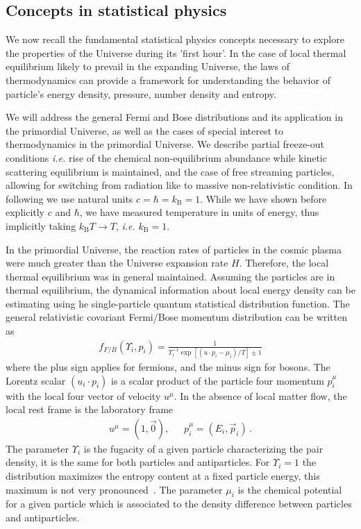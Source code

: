 \subsection{Concepts in statistical physics} \label{sec:statphys}
We now recall the fundamental statistical physics concepts necessary to explore the properties of the Universe during its 'first hour'. In the case of local thermal equilibrium likely to prevail in the expanding Universe, the laws of thermodynamics can provide a framework for understanding the behavior of particle's energy density, pressure, number density and entropy.

We will address the general Fermi and Bose distributions and its application in the primordial Universe, as well as the cases of special interest to thermodynamics in the primordial Universe. We  describe partial freeze-out conditions {\it i.e.\/} rise of the chemical non-equilibrium abundance while kinetic scattering equilibrium is maintained, and the case of free streaming particles, allowing for switching from radiation like to massive non-relativistic condition. In following we use natural units $c=\hbar=k_\mathrm{B}=1$. While we have shown before explicitly $c$ and $\hbar$, we have measured temperature in units of energy, thus implicitly taking $k_\mathrm{B}T\to T$, {\it i.e.\/} $k_\mathrm{B}=1$.

In the primordial Universe, the reaction rates of particles in the cosmic plasma were much greater than the Universe expansion rate $H$. Therefore, the local thermal equilibrium was in general maintained. Assuming the particles are in thermal equilibrium, the dynamical information about local energy density can be estimating using he single-particle quantum statistical distribution function. The general relativistic covariant Fermi/Bose momentum distribution can be written as
\begin{align}
f_{F/B}(\Upsilon_i,p_i)=\frac{1}{\Upsilon^{-1}_i\exp{\left[(u\cdot p_i-\mu_i)/T\right]}\pm1}
\end{align}
where the plus sign applies for fermions, and the minus sign for bosons. The Lorentz scalar $(u_i\cdot p_i)$ is a scalar product of the particle four momentum $p^\mu_i$ with the local four vector of velocity $u^\mu$. In the absence of local matter flow, the local rest frame is the laboratory frame 
\begin{align}
u^\mu=\left(1,\vec{0}\right),\,\,\,\,\,\,\,\,\, p^\mu_i=\left(E_i,\vec{p}_i\right)\,.
\end{align} 
The parameter $\Upsilon_i$ is the fugacity of a given particle characterizing the pair density, it is the same for both particles and antiparticles. For $\Upsilon_i=1$ the distribution maximizes the entropy content at a fixed particle energy, this maximum is not very pronounced~\cite{Letessier:1993qa}. The parameter $\mu_i$ is the chemical potential  for a given particle which is associated to the density difference between particles and antiparticles.

